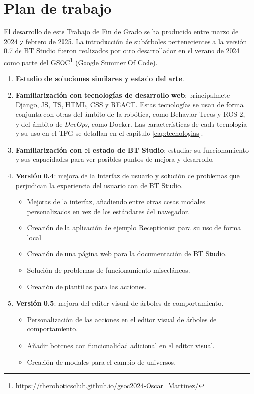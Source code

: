 \section{Plan de trabajo}

El desarrollo de este Trabajo de Fin de Grado se ha producido entre marzo de 2024 y febrero de 2025. La introducción de subárboles pertenecientes a la versión 0.7 de BT Studio fueron realizados por otro desarrollador en el verano de 2024 como parte del GSOC\footnote{\url{https://theroboticsclub.github.io/gsoc2024-Oscar_Martinez/}} (Google Summer Of Code). 

\begin{enumerate}
    \item \textbf{Estudio de soluciones similares y estado del arte}.
    
    \item \textbf{Familiarización con tecnologías de desarrollo web}: principalmete Django, JS, TS, HTML, CSS y REACT. Estas tecnologías se usan de forma conjunta con otras del ámbito de la robótica, como Behavior Trees y ROS 2, y del ámbito de \textit{DevOps}, como Docker. Las características de cada tecnología y su uso en el TFG se detallan en el capítulo \ref{cap:tecnologias}.

    \item \textbf{Familiarización con el estado de BT Studio}: estudiar su funcionamiento y sus capacidades para ver posibles puntos de mejora y desarrollo.

    \item \textbf{Versión 0.4}: mejora de la interfaz de usuario y solución de problemas que perjudican la experiencia del usuario con de BT Studio.  
    \begin{itemize}
        \item Mejoras de la interfaz, añadiendo entre otras cosas modales personalizados en vez de los estándares del navegador.
        \item Creación de la aplicación de ejemplo Receptionist para su uso de forma local.
        \item Creación de una página web para la documentación de BT Studio.
        \item Solución de problemas de funcionamiento misceláneos.
        \item Creación de plantillas para las acciones.
    \end{itemize}

    \item \textbf{Versión 0.5}: mejora del editor visual de árboles de comportamiento.
    \begin{itemize}
        \item Personalización de las acciones en el editor visual de árboles de comportamiento.
        \item Añadir botones con funcionalidad adicional en el editor visual.
        \item Creación de modales para el cambio de universos.
    \end{itemize}


\end{enumerate}
